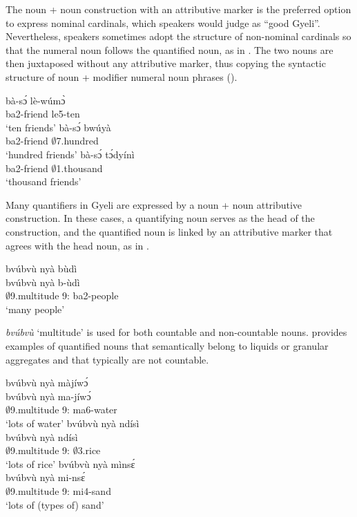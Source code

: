 \noindent The noun + noun construction with an attributive marker is the preferred option to express nominal cardinals, which speakers would judge as ``good Gyeli''. Nevertheless, speakers sometimes adopt the structure of non-nominal cardinals so that the numeral noun follows the quantified noun, as in . The two nouns are then juxtaposed without any attributive marker, thus copying the syntactic structure of noun + modifier numeral noun phrases ().

\ea\label{NounNum}
\ea \label{NounNum1}
  \gll     bà-sɔ́ lè-wúmɔ̀\\
                ba2-friend le5-ten \\
    \trans `ten friends'
\ex\label{NounNum2}
 \gll     bà-sɔ́ bwúyà \\
                ba2-friend $\emptyset$7.hundred \\
    \trans `hundred friends'
\ex\label{NounNum3}
 \gll     bà-sɔ́ tɔ́dyínì \\
                ba2-friend $\emptyset$1.thousand \\
    \trans `thousand friends'
\z
\z





Many quantifiers in Gyeli are expressed by a noun + noun attributive construction. In these cases, a quantifying noun serves as the head of the construction, and the quantified noun is linked by an attributive marker that agrees with the head noun, as in .

\ea\label{bvubvu}
  \glll     bvúbvù nyà bùdì \\
  bvúbvù nyà b-ùdì \\
                $\emptyset$9.multitude 9:{\ATT} ba2-people \\
    \trans `many people'
\z

 {\itshape bvúbvù} `multitude' is used for both countable and non-countable nouns.  provides examples of quantified nouns that semantically belong to liquids or granular aggregates and that typically are not countable.

\ea\label{bvu}
\ea \label{bvu1}
  \glll     bvúbvù nyà màjíwɔ́ \\
  bvúbvù nyà ma-jíwɔ́ \\
                $\emptyset$9.multitude 9:{\ATT} ma6-water \\
    \trans `lots of water'
\ex\label{bvu2}
 \glll     bvúbvù nyà ndísì  \\
 bvúbvù nyà ndísì  \\
             $\emptyset$9.multitude 9:{\ATT} $\emptyset$3.rice  \\
    \trans `lots of rice'
\ex\label{bvu3}
 \glll   bvúbvù nyà mìnsɛ́   \\
 bvúbvù nyà mi-nsɛ́   \\
             $\emptyset$9.multitude 9:{\ATT} mi4-sand    \\
    \trans `lots of (types of) sand'
\z
\z

